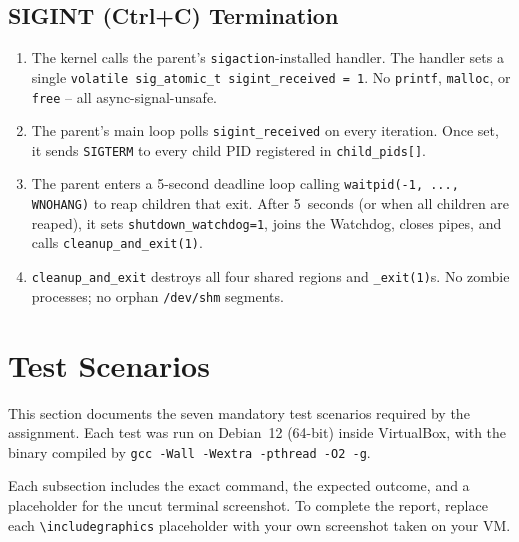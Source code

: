 \documentclass[11pt,a4paper]{article}
\newcommand{\code}[1]{\texttt{\small #1}}
\begin{document}
\subsection{SIGINT (Ctrl+C) Termination}

\begin{enumerate}
    \item The kernel calls the parent's \code{sigaction}-installed
        handler. The handler sets a single
        \code{volatile sig\_atomic\_t sigint\_received = 1}. No
        \code{printf}, \code{malloc}, or \code{free} -- all
        async-signal-unsafe.

    \item The parent's main loop polls \code{sigint\_received} on every
        iteration. Once set, it sends \code{SIGTERM} to every child PID
        registered in \code{child\_pids[]}.

    \item The parent enters a 5-second deadline loop calling
        \code{waitpid(-1, ..., WNOHANG)} to reap children that exit.
        After 5~seconds (or when all children are reaped), it sets
        \code{shutdown\_watchdog=1}, joins the Watchdog, closes pipes,
        and calls \code{cleanup\_and\_exit(1)}.

    \item \code{cleanup\_and\_exit} destroys all four shared regions
        and \code{\_exit(1)}s. No zombie processes; no orphan
        \code{/dev/shm} segments.
\end{enumerate}

\section{Test Scenarios}

This section documents the seven mandatory test scenarios required by
the assignment. Each test was run on Debian~12 (64-bit) inside
VirtualBox, with the binary compiled by
\code{gcc -Wall -Wextra -pthread -O2 -g}.

\begin{infobox}
Each subsection includes the exact command, the expected outcome, and
a placeholder for the uncut terminal screenshot. To complete the
report, replace each \code{\textbackslash{}includegraphics} placeholder
with your own screenshot taken on your VM.
\end{infobox}
\end{document}
